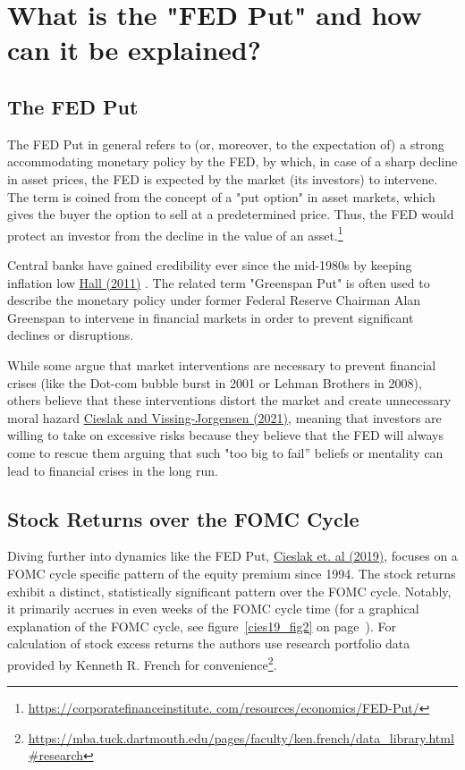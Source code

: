 \chapter{What is the "FED Put" and how can it be explained?}
\section{The FED Put}
The FED Put in general refers to (or, moreover, to the expectation of) a strong accommodating monetary policy by the FED, by which, in case of a sharp decline in asset prices, the FED is expected by the market (its investors) to intervene. The term is coined from the concept of a "put option" in asset markets, which gives the buyer the option to sell at a predetermined price. Thus, the FED would protect an investor from the decline in the value of an asset.\footnote{\url{https://corporatefinanceinstitute. com/resources/economics/FED-Put/}}

Central banks have gained credibility ever since the mid-1980s by keeping inflation low \hyperref[item:hall_is_2011]{Hall (2011)} . The related term "Greenspan Put" is often used to describe the monetary policy under former Federal Reserve Chairman Alan Greenspan to intervene in financial markets in order to prevent significant declines or disruptions. 

While some argue that market interventions are necessary to prevent financial crises (like the Dot-com bubble burst in 2001 or Lehman Brothers in 2008), others believe that these interventions distort the market and create unnecessary moral hazard \hyperref[item:cieslak_economics_2021]{Cieslak and Vissing-Jorgensen (2021)},  meaning that investors are willing to take on excessive risks because they believe that the FED will always come to rescue them arguing that such "too big to fail” beliefs or mentality can lead to financial crises in the long run.

\section{Stock Returns over the FOMC Cycle}

Diving further into dynamics like the FED Put,  \hyperref[item:cieslak_stock_2019]{Cieslak et. al (2019)}, focuses on a FOMC cycle specific pattern of the equity premium since 1994. 
The stock returns exhibit a distinct,  statistically significant pattern over the FOMC cycle.  Notably,  it primarily accrues in even weeks of the FOMC cycle time (for a graphical explanation of the FOMC cycle, see figure~\ref{cies19_fig2} on page~\pageref{cies19_fig2}). For calculation of stock excess returns the authors use research portfolio data provided by Kenneth R. French for convenience\footnote{\url{https://mba.tuck.dartmouth.edu/pages/faculty/ken.french/data_library.html\#research}}.

